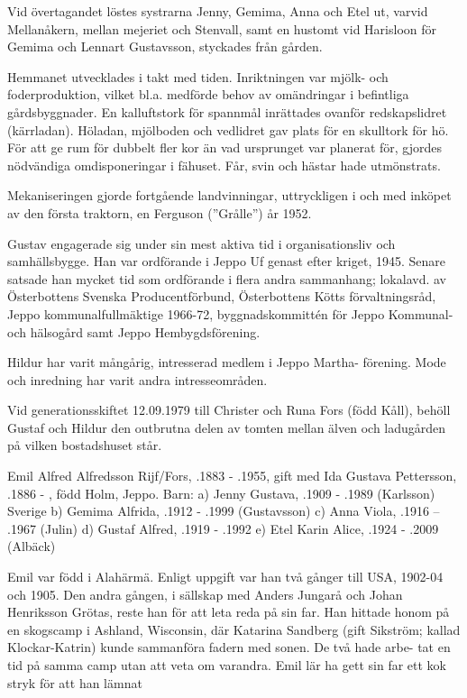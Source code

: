 Vid övertagandet löstes systrarna Jenny, Gemima, Anna och Etel ut, varvid Mellanåkern, mellan mejeriet och Stenvall, samt en hustomt vid Harisloon för Gemima och Lennart Gustavsson, styckades från gården.

Hemmanet utvecklades i takt med tiden. Inriktningen var mjölk- och foderproduktion, vilket bl.a. medförde behov av omändringar i befintliga gårdsbyggnader. En kalluftstork för spannmål inrättades ovanför redskapslidret (kärrladan). Höladan, mjölboden och vedlidret gav plats för en skulltork för hö. För att ge rum för dubbelt fler kor än vad ursprunget var planerat för, gjordes nödvändiga omdisponeringar i fähuset. Får, svin och hästar hade utmönstrats.

Mekaniseringen gjorde fortgående landvinningar, uttryckligen i och med inköpet av den första traktorn, en Ferguson (”Grålle”) år 1952.

Gustav engagerade sig under sin mest aktiva tid i organisationsliv och samhällsbygge. Han var ordförande i Jeppo Uf genast efter kriget, 1945. Senare satsade han mycket tid som ordförande i flera andra sammanhang; lokalavd. av Österbottens Svenska Producentförbund, Österbottens Kötts förvaltningsråd, Jeppo kommunalfullmäktige 1966-72, byggnadskommittén för Jeppo Kommunal- och hälsogård samt Jeppo Hembygdsförening.

Hildur har varit mångårig, intresserad medlem i Jeppo Martha- förening. Mode och inredning har varit andra intresseområden.

Vid generationsskiftet 12.09.1979 till Christer och Runa Fors (född Kåll), behöll Gustaf och Hildur den outbrutna delen av tomten mellan älven och ladugården på vilken bostadshuset står.


Emil Alfred Alfredsson Rijf/Fors, .1883 - .1955, gift med Ida Gustava Pettersson, .1886 - , född Holm, Jeppo. Barn: a) Jenny Gustava, .1909 - .1989 (Karlsson) Sverige
b) Gemima Alfrida, .1912 - .1999 (Gustavsson) c) Anna Viola, .1916 – .1967 (Julin)
d) Gustaf Alfred, .1919 - .1992
e) Etel Karin Alice, .1924 - .2009 (Albäck)

Emil var född i Alahärmä. Enligt uppgift var han två gånger till USA, 1902-04 och 1905. Den andra gången, i sällskap med Anders Jungarå och Johan Henriksson Grötas, reste han för att leta reda på sin far. Han hittade honom på en skogscamp i Ashland, Wisconsin, där Katarina Sandberg (gift Sikström; kallad Klockar-Katrin) kunde sammanföra fadern med sonen. De två hade arbe- tat en tid på samma camp utan att veta om varandra. Emil lär ha gett sin far ett kok stryk för att han lämnat

